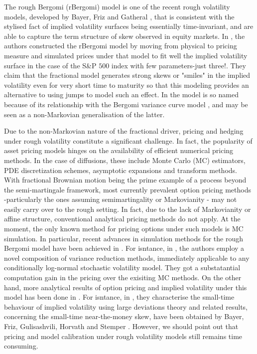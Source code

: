 \documentclass[11pt]{article}
\begin{document}
 The rough Bergomi (rBergomi) model is one of the recent rough volatility models, developed by Bayer, Friz and Gatheral \cite{bayer2016pricing},  that is consistent with the stylised fact of implied volatility surfaces being essentially time-invariant, and are able to capture the term structure of skew observed in equity markets. In \cite{bayer2016pricing}, the authors constructed the rBergomi model by  moving from  physical to pricing measure and simulated prices under that model to fit well the implied volatility surface in the case of the S\&P $500$ index with
 few parameters-just three!. They claim that the fractional model generates strong skews or "smiles" in the implied volatility even for very short time to maturity so that this modeling provides an
 alternative to using jumps to model such an effect. In \cite{bayer2016pricing} the model is so named because of its relationship with the Bergomi variance curve model \cite{bergomi2005smile}, and may be seen as a non-Markovian
generalisation of the latter.




 Due to the non-Markovian nature of the fractional driver, pricing  and hedging under rough volatility constitute a significant challenge. In fact, the popularity of asset pricing models hinges on the availability of efficient numerical pricing methods. In the case of diffusions, these include Monte Carlo (MC) estimators, PDE discretization schemes, asymptotic expansions and transform
methods. With fractional Brownian motion being the prime example of a process beyond the semi-martingale framework, most currently prevalent option pricing methods -particularly the ones assuming semimartingality or Markovianity - may not easily carry over to the rough setting. In fact,  due to the lack of Markovianity or affine structure, conventional analytical pricing methods  do not apply. At the moment, the only known method for pricing  options under such models is MC simulation. In particular, recent advances in simulation methods for the rough Bergomi model have been achieved in \cite{bayer2016pricing,bayer2017regularity,mccrickerd2017turbocharging,bennedsen2017hybrid,jacquier2018vix}. For isntance, in \cite{mccrickerd2017turbocharging}, the authors employ a novel composition of variance reduction methods, immediately applicable to any conditionally log-normal  stochastic volatility model. They got a substatantial computation gain in the pricing  over the exisiting MC methods. On the other hand,  more analytical results of option pricing and implied volatility under this model has been done in \cite{jacquier2017pathwise,bayer2017short,forde2017asymptotics}. For isntance, in \cite{jacquier2017pathwise},
they  characterise the small-time behaviour of implied volatility using large deviations theory and  related results, concerning the small-time near-the-money skew, have been  obtained by Bayer, Friz, Gulisashvili, Horvath and Stemper \cite{bayer2017short}. However, we should point out that pricing and model calibration under rough volatility models still remains time consuming.
\end{document}
